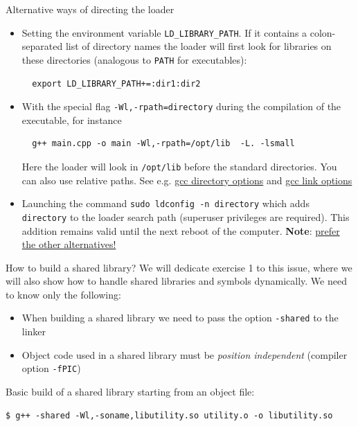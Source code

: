\documentclass[10pt,aspectratio=169]{beamer}
\begin{document}
\begin{frame}[fragile]{Alternative ways of directing the loader}
  \begin{itemize}
  \item Setting the environment variable \texttt{LD\_LIBRARY\_PATH}. If
    it contains a colon-separated list of directory names the
    loader will first look for libraries on these directories (analogous to \texttt{PATH} for executables):
\begin{verbatim}
  export LD_LIBRARY_PATH+=:dir1:dir2
\end{verbatim}
\item With the special flag \texttt{-Wl,-rpath=directory}
  during the compilation of the executable, for instance
\begin{verbatim}
  g++ main.cpp -o main -Wl,-rpath=/opt/lib  -L. -lsmall
\end{verbatim}
Here the loader will look in \texttt{/opt/lib} before the standard directories. You can also use relative paths. See e.g. \href{https://gcc.gnu.org/onlinedocs/gcc/Directory-Options.html}{\color{blue}gcc directory options} and \href{https://gcc.gnu.org/onlinedocs/gcc/Link-Options.html}{\color{blue}gcc link options}
\item Launching the command \texttt{sudo ldconfig -n directory} which adds \texttt{directory} to the loader search path (superuser privileges are required). This addition remains valid until the next reboot of the computer. \textbf{Note}: \underline{prefer the other alternatives!}
  \end{itemize}
\end{frame}

\begin{frame}[fragile]{How to build a shared library?}
  We will dedicate exercise 1 to this issue, where we will also show how to handle shared libraries and symbols dynamically.
  We need to know only the following:
  \begin{itemize}
  \item When building a shared library we need to pass the option \texttt{-shared} to the linker
  \item Object code used in a shared library must be \emph{position independent} (compiler option \texttt{-fPIC})
  \end{itemize}

  Basic build of a shared library starting from an object file:
\begin{verbatim}
$ g++ -shared -Wl,-soname,libutility.so utility.o -o libutility.so
\end{verbatim}
\end{frame}
\end{document}

